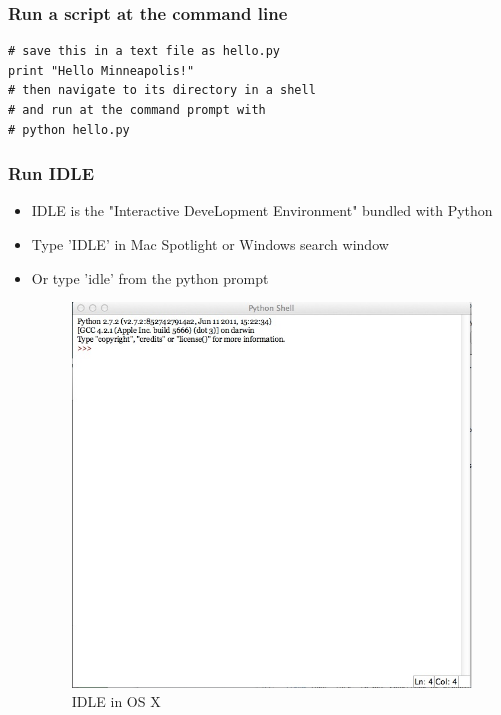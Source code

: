 \documentclass{beamer}
\begin{document}
\begin{frame}[fragile]
\frametitle{Run a script at the command line}
\begin{lstlisting}
# save this in a text file as hello.py
print "Hello Minneapolis!"
# then navigate to its directory in a shell
# and run at the command prompt with 
# python hello.py
\end{lstlisting}
\end{frame}

\begin{frame}[fragile]
\frametitle{Run IDLE}
\begin{itemize}
  \item IDLE is the "Interactive DeveLopment Environment" bundled with Python
  \item Type 'IDLE' in Mac Spotlight or Windows search window
  \item Or type 'idle' from the python prompt
  \begin{figure}
 \includegraphics[scale=0.25]{idle.jpg} 
 \caption{IDLE in OS X}
\end{figure}
\end{itemize} 
\end{frame}
\end{document}
